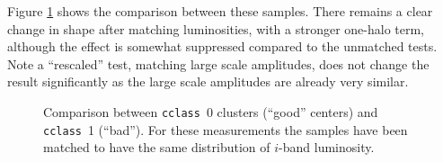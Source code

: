 \documentclass[12pt,preprint]{aastex}
\newcommand{\cclass}{\texttt{cclass}}
\begin{document}
Figure \ref{fig:compmatch} shows the comparison between these samples.  
There remains a clear change in shape after matching luminosities, with
a stronger one-halo term, although the effect is somewhat suppressed 
compared to the unmatched tests.  Note a ``rescaled'' test, matching
large scale amplitudes, does not change the result significantly as the
large scale amplitudes are already very similar.

\begin{figure}[h]

\caption{Comparison between \cclass\ 0 clusters (``good'' centers) and \cclass\
1 (``bad'').  For these measurements the samples have been matched to have the
same distribution of $i$-band luminosity.} \label{fig:compmatch}
\epsscale{1}

\end{figure}
\end{document}
